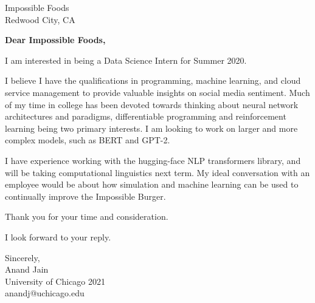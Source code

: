 \documentclass[11pt,a4paper]{letter} %
\begin{document}
\begin{letter}{Impossible Foods \\ Redwood City, CA} 

\opening{\textbf{Dear Impossible Foods,}}

I am interested in being a Data Science Intern for Summer 2020.

I believe I have the qualifications in programming, machine learning, and cloud service management to provide valuable insights on social media sentiment.
Much of my time in college has been devoted towards thinking about neural network architectures and paradigms, differentiable programming and reinforcement learning being two primary interests. 
I am looking to work on larger and more complex models, such as BERT and GPT-2.

I have experience working with the hugging-face NLP transformers library, and will be taking computational linguistics next term.
My ideal conversation with an employee would be about how simulation and machine learning can be used to continually improve the Impossible Burger.

Thank you for your time and consideration.

I look forward to your reply.

\closing{Sincerely, \\ Anand Jain \\ University of Chicago 2021 \\ anandj@uchicago.edu}

\end{letter}
 
\end{document}
